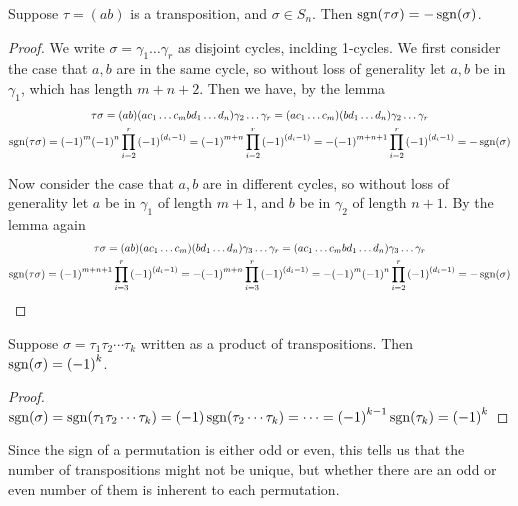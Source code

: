 \pagebreak

\begin{proposition}
    Suppose \(\tau = (ab)\) is a transposition, and \(\sigma \in S_n\).
    Then \(\operatorname{sgn}(\tau\sigma) = -\operatorname{sgn}(\sigma)\).
\end{proposition}
\begin{proof}
    We write \(\sigma = \gamma_1\hdots\gamma_r\) as disjoint cycles,
    inclding 1-cycles.
    We first consider the case that \(a,b\) are in the same cycle,
    so without loss of generality let \(a,b\) be in \(\gamma_1\),
    which has length \(m+n+2\).
    Then we have, by the lemma
    \begin{gather*}
        \tau\sigma
        = (ab)(ac_1 \hdots c_m bd_1 \hdots d_n)\gamma_2\hdots\gamma_r
        = (ac_1 \hdots c_m)(bd_1 \hdots d_n)\gamma_2\hdots\gamma_r \\
        \operatorname{sgn}(\tau\sigma)
        = {(-1)}^m{(-1)}^n \prod_{i=2}^r {(-1)}^{(d_i-1)}
        = {(-1)}^{m+n} \prod_{i=2}^r {(-1)}^{(d_i-1)}
        = -{(-1)}^{m+n+1} \prod_{i=2}^r {(-1)}^{(d_i-1)}
        = -\operatorname{sgn}(\sigma)
    \end{gather*}

    Now consider the case that \(a,b\) are in different cycles,
    so without loss of generality
    let \(a\) be in \(\gamma_1\) of length \(m+1\),
    and \(b\) be in \(\gamma_2\) of length \(n+1\).
    By the lemma again
    \begin{gather*}
        \tau\sigma
        = (ab)(ac_1 \hdots c_m)(bd_1 \hdots d_n)\gamma_3\hdots\gamma_r
        = (ac_1 \hdots c_m bd_1 \hdots d_n)\gamma_3\hdots\gamma_r \\
        \operatorname{sgn}(\tau\sigma)
        = {(-1)}^{m+n+1} \prod_{i=3}^r {(-1)}^{(d_i-1)}
        = -{(-1)}^{m+n} \prod_{i=3}^r {(-1)}^{(d_i-1)}
        = -{(-1)}^m{(-1)}^n \prod_{i=2}^r {(-1)}^{(d_i-1)}
        = -\operatorname{sgn}(\sigma)
    \end{gather*}
\end{proof}
\begin{corollary}\label{cor:sgn-transposition}
    Suppose \(\sigma = \tau_1\tau_2\cdots\tau_k\)
    written as a product of transpositions.
    Then \(\operatorname{sgn}(\sigma) = {(-1)}^k\).
\end{corollary}
\begin{proof}
    \(\operatorname{sgn}(\sigma) = \operatorname{sgn}(\tau_1\tau_2\cdots\tau_k)
    = (-1)\operatorname{sgn}(\tau_2\cdots\tau_k)
    = \cdots = {(-1)}^{k-1}\operatorname{sgn}(\tau_k)
    = {(-1)}^k\)
\end{proof}
\begin{remark}
    Since the sign of a permutation is either odd or even,
    this tells us that the number of transpositions might not be unique,
    but whether there are an odd or even number of them
    is inherent to each permutation.
\end{remark}

